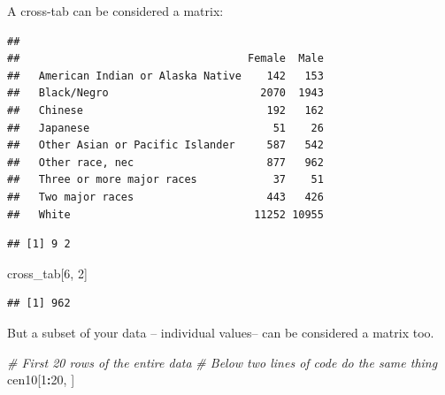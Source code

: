 \documentclass[]{book}
\newenvironment{Shaded}{\begin{snugshade}}{\end{snugshade}}
\newcommand{\KeywordTok}[1]{\textcolor[rgb]{0.13,0.29,0.53}{\textbf{#1}}}
\newcommand{\DecValTok}[1]{\textcolor[rgb]{0.00,0.00,0.81}{#1}}
\newcommand{\StringTok}[1]{\textcolor[rgb]{0.31,0.60,0.02}{#1}}
\newcommand{\CommentTok}[1]{\textcolor[rgb]{0.56,0.35,0.01}{\textit{#1}}}
\newcommand{\OperatorTok}[1]{\textcolor[rgb]{0.81,0.36,0.00}{\textbf{#1}}}
\newcommand{\NormalTok}[1]{#1}
\theoremstyle{definition}
\theoremstyle{definition}
\theoremstyle{definition}
\theoremstyle{remark}
\begin{document}
A cross-tab can be considered a matrix:

\begin{Shaded}
\end{Shaded}

\begin{verbatim}
##                                   
##                                    Female  Male
##   American Indian or Alaska Native    142   153
##   Black/Negro                        2070  1943
##   Chinese                             192   162
##   Japanese                             51    26
##   Other Asian or Pacific Islander     587   542
##   Other race, nec                     877   962
##   Three or more major races            37    51
##   Two major races                     443   426
##   White                             11252 10955
\end{verbatim}

\begin{Shaded}
\end{Shaded}

\begin{verbatim}
## [1] 9 2
\end{verbatim}

\begin{Shaded}
\begin{Highlighting}[]
\NormalTok{cross_tab[}\DecValTok{6}\NormalTok{, }\DecValTok{2}\NormalTok{]}
\end{Highlighting}
\end{Shaded}

\begin{verbatim}
## [1] 962
\end{verbatim}

But a subset of your data -- individual values-- can be considered a
matrix too.

\begin{Shaded}
\begin{Highlighting}[]
\CommentTok{# First 20 rows of the entire data}
\CommentTok{# Below two lines of code do the same thing}
\NormalTok{cen10[}\DecValTok{1}\OperatorTok{:}\DecValTok{20}\NormalTok{, ]}
\end{Highlighting}
\end{Shaded}
\end{document}
